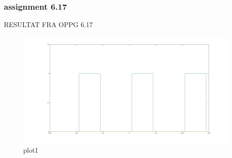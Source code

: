 \documentclass{article}
\begin{document}
\newpage
\subsubsection{assignment 6.17}
RESULTAT FRA OPPG 6.17
\begin{figure}[h!]
    \centering
    \includegraphics[scale=0.15]{OPPG617.jpg}
    \caption{plot1}
    \label{fig:plot1}
\end{figure}
\end{document}
